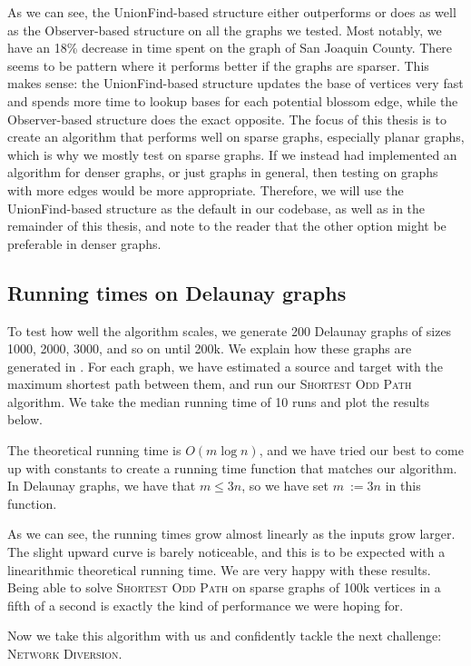 As we can see, the UnionFind-based structure either outperforms or does as well as the Observer-based structure on all the graphs we tested. Most notably, we have an 18\% decrease in time spent on the graph of San Joaquin County. There seems to be pattern where it performs better if the graphs are sparser. This makes sense: the UnionFind-based structure updates the base of vertices very fast and spends more time to lookup bases for each potential blossom edge, while the Observer-based structure does the exact opposite. The focus of this thesis is to create an algorithm that performs well on sparse graphs, especially planar graphs, which is why we mostly test on sparse graphs. If we instead had implemented an algorithm for denser graphs, or just graphs in general, then testing on graphs with more edges would be more appropriate. Therefore, we will use the UnionFind-based structure as the default in our codebase, as well as in the remainder of this thesis, and note to the reader that the other option might be preferable in denser graphs.

\subsection{Running times on Delaunay graphs}
\label{subsubsection:odd-path-delaunay-testing}
To test how well the algorithm scales, we generate 200 Delaunay graphs of sizes 1000, 2000, 3000, and so on until 200k. We explain how these graphs are generated in . For each graph, we have estimated a source and target with the maximum shortest path between them, and run our \textsc{Shortest Odd Path} algorithm. We take the median running time of 10 runs and plot the results below.

The theoretical running time is $O(m \log n)$, and we have tried our best to come up with constants to create a running time function that matches our algorithm. In Delaunay graphs, we have that $m \leq 3n$, so we have set $m~:= 3n$ in this function.

\begin{center}
    
\end{center}

As we can see, the running times grow almost linearly as the inputs grow larger. The slight upward curve is barely noticeable, and this is to be expected with a linearithmic theoretical running time. We are very happy with these results. Being able to solve \textsc{Shortest Odd Path} on sparse graphs of 100k vertices in a fifth of a second is exactly the kind of performance we were hoping for. 

Now we take this algorithm with us and confidently tackle the next challenge: \textsc{Network Diversion}.
